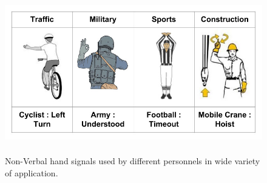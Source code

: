 \begin{figure}
	[h] \centering 
	\includegraphics[height=7cm]{figures/content/ges-signals.jpg} \caption{Non-Verbal hand signals used by different personnels in wide variety of application. \cite{hand-signal} } \label{fg:ges:signal} 
\end{figure}
